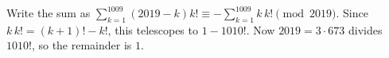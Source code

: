 Write the sum as $\sum_{k=1}^{1009}(2019-k)k!\equiv-\sum_{k=1}^{1009}k\,k!\pmod{2019}$. Since $k\,k!=(k+1)!-k!$, this telescopes to $1-1010!$. Now $2019=3\cdot673$ divides $1010!$, so the remainder is $\boxed1$.
